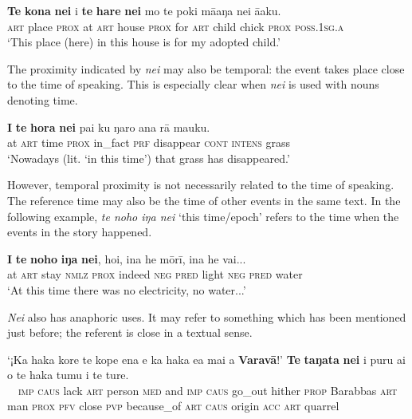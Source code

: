 \ea\label{ex:4.206}
\gll \textbf{Te} \textbf{kona} \textbf{nei} {\ꞌ}i \textbf{te} \textbf{hare} \textbf{nei} mo te poki mā{\ꞌ}aŋa nei {\ꞌ}ā{\ꞌ}aku. \\
\textsc{art} place \textsc{prox} at \textsc{art} house \textsc{prox} for \textsc{art} child chick \textsc{prox} \textsc{poss.1sg.a} \\

\glt
‘This place (here) in this house is for my adopted child.’ \textstyleExampleref{[R229.271]} 
\z

The proximity indicated by \textit{nei} may also be temporal: the event takes place close to the time of speaking. This is especially clear when \textit{nei} is used with nouns denoting time.

\ea\label{ex:4.207}
\gll \textbf{{\ꞌ}I} \textbf{te} \textbf{hora} \textbf{nei} pa{\ꞌ}i ku ŋaro {\ꞌ}ana rā mauku.\\
at \textsc{art} time \textsc{prox} in\_fact \textsc{prf} disappear \textsc{cont} \textsc{intens} grass\\

\glt
‘Nowadays (lit. ‘in this time’) that grass has disappeared.’ \textstyleExampleref{[R106.050]} 
\z

However, temporal proximity is not necessarily related to the time of speaking. The reference time may also be the time of other events in the same text. In the following example, \textit{te noho iŋa nei} ‘this time/epoch’ refers to the time when the events in the story happened. 

\ea\label{ex:4.208}
\gll \textbf{{\ꞌ}I} \textbf{te} \textbf{noho} \textbf{iŋa} \textbf{nei}, ho{\ꞌ}i, {\ꞌ}ina he mōrī, {\ꞌ}ina he vai... \\
at \textsc{art} stay \textsc{nmlz} \textsc{prox} indeed \textsc{neg} \textsc{pred} light \textsc{neg} \textsc{pred} water \\

\glt
‘At this time there was no electricity, no water...’ \textstyleExampleref{[R539-1.092]}
\z

\textit{Nei} also has anaphoric uses. It may refer to something which has been mentioned just before; the referent is close in a textual sense.

\ea\label{ex:4.209}
\gll ‘¡Ka haka kore te kope ena {\ꞌ}e ka haka e{\ꞌ}a mai a \textbf{Varavā}!’  \textbf{Te} \textbf{taŋata} \textbf{nei} i puru ai {\ꞌ}o te haka tumu i te ture.\\
~~\textsc{imp} \textsc{caus} lack \textsc{art} person \textsc{med} and \textsc{imp} \textsc{caus} go\_out hither \textsc{prop} Barabbas  \textsc{art} man \textsc{prox} \textsc{pfv} close \textsc{pvp} because\_of \textsc{art} \textsc{caus} origin \textsc{acc} \textsc{art} quarrel\\

